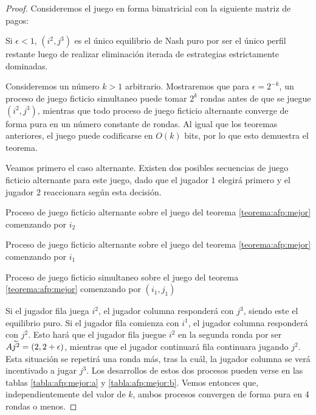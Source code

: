 \begin{proof}
    Consideremos el juego en forma bimatricial con la siguiente matriz de pagos:

    

    Si $\epsilon < 1$, $(i^2, j^3)$ es el único equilibrio de Nash puro por ser el único perfil restante luego de realizar eliminación iterada de estrategias estrictamente dominadas.

    Consideremos un número $k > 1$ arbitrario. Mostraremos que para $\epsilon = 2^{-k}$, un proceso de juego ficticio simultaneo puede tomar $2^k$ rondas antes de que se juegue $(i^2, j^3)$, mientras que todo proceso de juego ficticio alternante converge de forma pura en un número constante de rondas. Al igual que los teoremas anteriores, el juego puede codificarse en $O(k)$ bits, por lo que esto demuestra el teorema.

    Veamos primero el caso alternante. Existen dos posibles secuencias de juego ficticio alternante para este juego, dado que el jugador $1$ elegirá primero y el jugador $2$ reaccionara según esta decisión.

    \begin{table}
        \centering
        
        \caption{Proceso de juego ficticio alternante sobre el juego del teorema \ref{teorema:afp:mejor} comenzando por $i_2$}
        \label{tabla:afp:mejor:b}
        \centering
        
        \caption{Proceso de juego ficticio alternante sobre el juego del teorema \ref{teorema:afp:mejor} comenzando por $i_1$}
        \label{tabla:afp:mejor:a}
        \centering
        
        \caption{Proceso de juego ficticio simultaneo sobre el juego del teorema \ref{teorema:afp:mejor} comenzando por $(i_1, j_1)$}
        \label{tabla:afp:mejor:c}
    \end{table}

    Si el jugador fila juega $i^2$, el jugador columna responderá con $j^3$, siendo este el equilibrio puro. Si el jugador fila comienza con $i^1$, el jugador columna responderá con $j^2$. Esto hará que el jugador fila juegue $i^2$ en la segunda ronda por ser $A\widetilde{j^2} = (2, 2 + \epsilon)$, mientras que el jugador continuará fila continuara jugando $j^2$. Esta situación se repetirá una ronda más, tras la cuál, la jugador columna se verá incentivado a jugar $j^3$. Los desarrollos de estos dos procesos pueden verse en las tablas \ref{tabla:afp:mejor:a} y \ref{tabla:afp:mejor:b}. Vemos entonces que, independientemente del valor de $k$, ambos procesos convergen de forma pura en 4 rondas o menos.


\end{proof}
